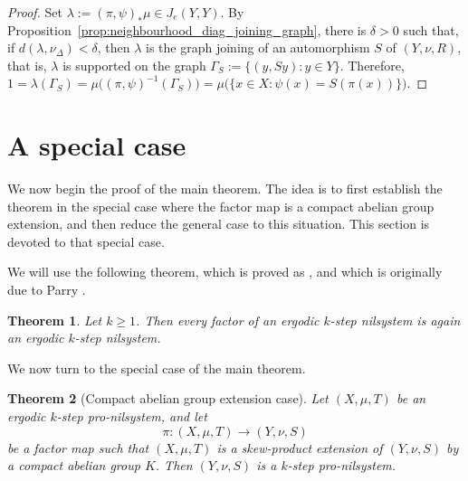 \documentclass[12pt]{amsart}
\theoremstyle{plain}
\newtheorem{theorem}{Theorem}[section]
\theoremstyle{definition}
\begin{document}
\begin{proof}
Set $\lambda := (\pi,\psi)_*\mu \in J_e(Y, Y)$. By Proposition~\ref{prop:neighbourhood_diag_joining_graph}, there is $\delta>0$ such that, if $d(\lambda,\nu_\Delta)<\delta$, then $\lambda$ is the graph joining of an automorphism $S$ of $(Y,\nu,R)$, that is, $\lambda$ is supported on the graph $\Gamma_S := \{(y,Sy): y \in Y\}$. Therefore,
$1 = \lambda(\Gamma_S)
  = \mu\bigl((\pi,\psi)^{-1}(\Gamma_S)\bigr)
  = \mu\bigl(\{x \in X : \psi(x)=S(\pi(x))\}\bigr)$. 
\end{proof}


\section{A special case}\label{sec:special}
We now begin the proof of the main theorem.
The idea is to first establish the theorem in the special case where the factor map is a compact abelian group extension, and then reduce the general case to this situation.
This section is devoted to that special case.

We will use the following theorem, which is proved as \cite[Chapter~13, Theorem~11]{hk-book}, and which is originally due to Parry \cite{parry}.  

\begin{theorem}\label{thrm:factor_of_nilsystem_is_nilsystem}
    Let $k \geq 1$.
    Then every factor of an ergodic $k$-step nilsystem is again an ergodic $k$-step nilsystem.
\end{theorem}

We now turn to the special case of the main theorem.

\begin{theorem}[Compact abelian group extension case]\label{thrm:special_case}
    Let $(X,\mu,T)$ be an ergodic $k$-step pro-nilsystem, and let
    \[
    \pi \colon (X,\mu,T)\to (Y,\nu,S)
    \]
    be a factor map such that $(X,\mu,T)$ is a skew-product extension of $(Y,\nu,S)$ by a compact abelian group $K$.
    Then $(Y,\nu,S)$ is a $k$-step pro-nilsystem.
\end{theorem}
\end{document}
